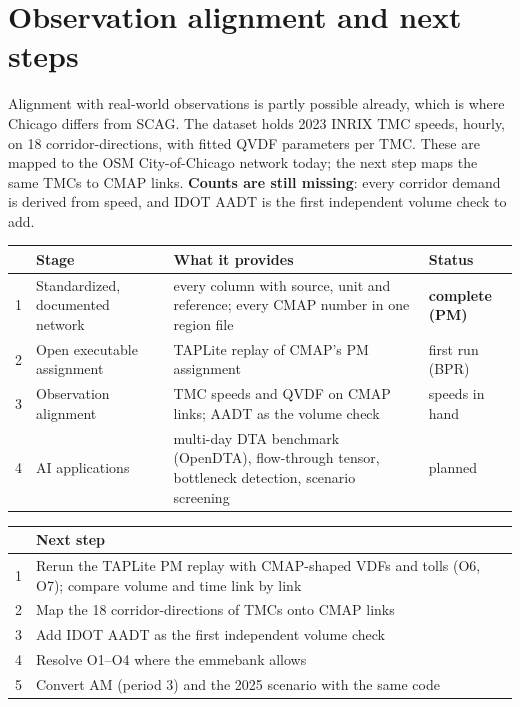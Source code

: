 \documentclass[10pt,a4paper]{extarticle}
\newcommand{\C}[1]{\texttt{\small\detokenize{#1}}}
\newcommand{\ok}[1]{\textcolor{good}{\textbf{#1}}}
\newcommand{\md}[1]{\textcolor{warn}{#1}}
\begin{document}
\section{Observation alignment and next steps}

Alignment with real-world observations is partly possible already, which is where Chicago differs from SCAG.
The dataset holds 2023 INRIX TMC speeds, hourly, on 18 corridor-directions, with fitted QVDF parameters per
TMC. These are mapped to the OSM City-of-Chicago network today; the next step maps the same TMCs to CMAP
links. \textbf{Counts are still missing}: every corridor demand is derived from speed, and IDOT AADT is the
first independent volume check to add.

\begin{center}
\begin{tabular}{@{}r>{\raggedright\arraybackslash}p{}>{\raggedright\arraybackslash}p{}l@{}}
\toprule
& \textbf{Stage} & \textbf{What it provides} & \textbf{Status} \\
\midrule
1 & Standardized, documented network & every \C{link.csv} column with source, unit and reference; every CMAP
number in one region file & \ok{complete (PM)} \\
2 & Open executable assignment & TAPLite replay of CMAP's PM assignment & \md{first run (BPR)} \\
3 & Observation alignment & TMC speeds and QVDF on CMAP links; AADT as the volume check & \md{speeds in hand} \\
4 & AI applications & multi-day DTA benchmark (OpenDTA), flow-through tensor, bottleneck detection,
scenario screening & planned \\
\bottomrule
\end{tabular}
\end{center}

\begin{center}
\begin{tabular}{@{}rp{}@{}}
\toprule
& \textbf{Next step} \\
\midrule
1 & Rerun the TAPLite PM replay with CMAP-shaped VDFs and tolls (O6, O7); compare volume and time link by link \\
2 & Map the 18 corridor-directions of TMCs onto CMAP links \\
3 & Add IDOT AADT as the first independent volume check \\
4 & Resolve O1--O4 where the emmebank allows \\
5 & Convert AM (period 3) and the 2025 scenario with the same code \\
\bottomrule
\end{tabular}
\end{center}
\end{document}
